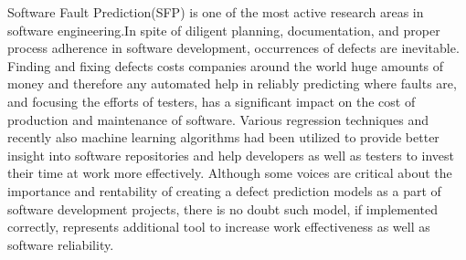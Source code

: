 Software Fault Prediction(SFP) is one of the most active research areas in software engineering.In spite of diligent planning, documentation, and proper process adherence in software development, occurrences of defects are inevitable. Finding and fixing defects costs companies around the world huge amounts of money and therefore any automated help in reliably predicting where faults are, and focusing the efforts of testers, has a significant impact on the cost of production and maintenance of software. Various regression techniques and recently also machine learning algorithms had been utilized to provide better insight into software repositories and help developers as well as testers to invest their time at work more effectively. Although some voices are critical about the importance and rentability of creating a defect prediction models as a part of software development projects, there is no doubt such model, if implemented correctly, represents additional tool to increase work effectiveness as well as software reliability.